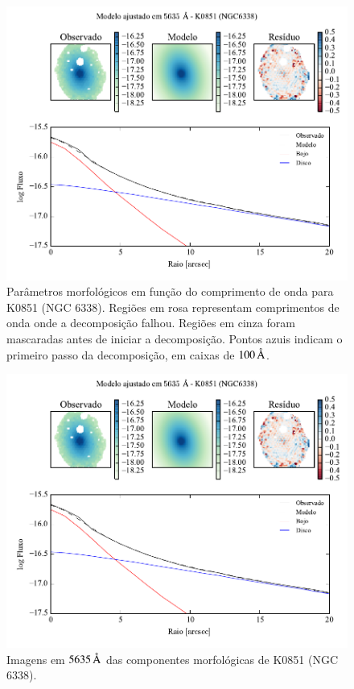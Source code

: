 \begin{figure}
	\includegraphics[page=2]{figuras-decomp/K0851_sample006a}
	\caption[Parâmetros morfológicos em função do comprimento de onda de K0851
	(NGC 6338)]
	{Parâmetros morfológicos em função do comprimento de onda para
	K0851 (NGC 6338). Regiões em rosa representam comprimentos de onda onde a
	decomposição falhou. Regiões em cinza foram mascaradas antes de iniciar a
	decomposição. Pontos azuis indicam o primeiro passo da decomposição, em caixas
	de $100\,\text{\normalfont\AA}$.}
	\label{fig:decompParams:K0851}
\end{figure}

\begin{figure}
	\includegraphics[page=3]{figuras-decomp/K0851_sample006a}
	\caption[Imagens em $5635\,\angstrom$ das componentes morfológicas de K0851
	(NGC 6338)]
	{Imagens em $5635\,\angstrom$ das componentes morfológicas de K0851
	(NGC 6338).}
	\label{fig:decompImages:K0851}
\end{figure}

